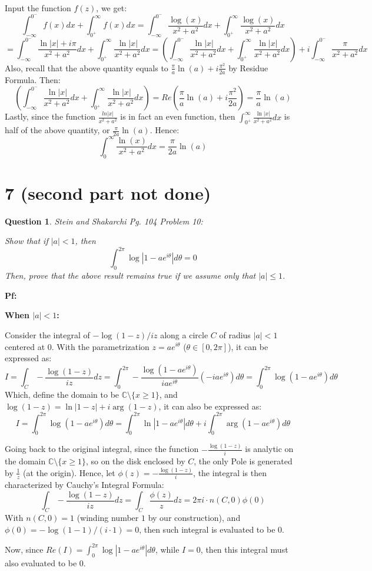 \documentclass{article}
\newtheorem{question}{Question}
\begin{document}
Input the function $f(z)$, we get:
$$\int_{-\infty}^{0^-}f(x)dx + \int_{0^+}^{\infty}f(x)dx = \int_{-\infty}^{0^-}\frac{\log(x)}{x^2+a^2}dx + \int_{0^+}^{\infty}\frac{\log(x)}{x^2+a^2}dx$$
$$=\int_{-\infty}^{0^-}\frac{\ln|x|+i\pi}{x^2+a^2}dx + \int_{0^+}^{\infty}\frac{\ln|x|}{x^2+a^2}dx = \left(\int_{-\infty}^{0^-}\frac{\ln|x|}{x^2+a^2}dx + \int_{0^+}^{\infty}\frac{\ln|x|}{x^2+a^2}dx\right)+i\int_{-\infty}^{0^-}\frac{\pi}{x^2+a^2}dx$$
Also, recall that the above quantity equals to $\frac{\pi}{a}\ln(a)+i\frac{\pi^2}{2a}$ by Residue Formula. Then:
$$\left(\int_{-\infty}^{0^-}\frac{\ln|x|}{x^2+a^2}dx + \int_{0^+}^{\infty}\frac{\ln|x|}{x^2+a^2}dx\right) = Re\left(\frac{\pi}{a}\ln(a)+i\frac{\pi^2}{2a}\right) = \frac{\pi}{a}\ln(a)$$
Lastly, since the function $\frac{ln|x|}{x^2+a^2}$ is in fact an even function, then $\int_{0^+}^{\infty}\frac{\ln|x|}{x^2+a^2}dx$ is half of the above quantity, or $\frac{\pi}{2a}\ln(a)$.
Hence:
$$\int_{0}^{\infty}\frac{\ln(x)}{x^2+a^2}dx = \frac{\pi}{2a}\ln(a)$$

\break

\section*{7 (second part not done)}
\begin{myBox}[]{}
    \begin{question} Stein and Shakarchi Pg. 104 Problem 10:

        Show that if $|a|<1$, then
        $$\int_{0}^{2\pi}\log|1-ae^{i\theta}|d\theta =0$$
        Then, prove that the above result remains true if we assume only that $|a|\leq 1$.
    \end{question}
\end{myBox}

\textbf{Pf:}

\textbf{When $|a|<1$:}

Consider the integral of $-\log(1-z)/iz$ along a circle $C$ of radius $|a|<1$ centered at $0$. With the parametrization $z=ae^{i\theta}$ ($\theta\in [0,2\pi]$), it can be expressed as:
$$I=\int_{C}-\frac{\log(1-z)}{iz}dz = \int_{0}^{2\pi}-\frac{\log(1-ae^{i\theta})}{iae^{i\theta}}(-iae^{i\theta})d\theta = \int_{0}^{2\pi}\log(1-ae^{i\theta})d\theta$$
Which, define the domain to be $\mathbb{C}\setminus\{x\geq 1\}$, and $\log(1-z)=\ln|1-z|+i\arg(1-z)$, it can also be expressed as:
$$I= \int_{0}^{2\pi}\log(1-ae^{i\theta})d\theta=\int_{0}^{2\pi}\ln|1-ae^{i\theta}|d\theta + i\int_{0}^{2\pi}\arg(1-ae^{i\theta})d\theta$$

Going back to the original integral, since the function $-\frac{\log(1-z)}{i}$ is analytic on the domain $\mathbb{C}\setminus\{x\geq 1\}$, so on the disk enclosed by $C$, the only Pole 
is generated by $\frac{1}{z}$ (at the origin). Hence, let $\phi(z)=-\frac{\log(1-z)}{i}$, the integral is then characterized by Cauchy's Integral Formula:
$$\int_{C}-\frac{\log(1-z)}{iz}dz = \int_{C}\frac{\phi(z)}{z}dz = 2\pi i\cdot n(C,0)\phi(0)$$
With $n(C,0)=1$ (winding number $1$ by our construction), and $\phi(0)=-\log(1-1)/(i\cdot 1)=0$, then such integral is evaluated to be $0$.

Now, since $Re(I) = \int_{0}^{2\pi}\log|1-ae^{i\theta}|d\theta$, while $I=0$, then this integral must also evaluated to be $0$.
\end{document}
